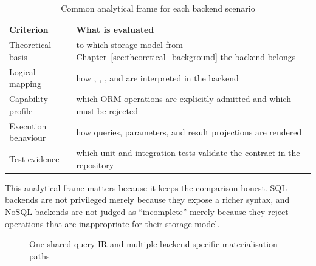 \begin{table}[H]
\centering
\small
\caption{Common analytical frame for each backend scenario}
\label{tab:backend_analysis_frame}
\begin{tabularx}{\textwidth}{L{3.3cm}Y}
\toprule
\textbf{Criterion} & \textbf{What is evaluated} \\
\midrule
Theoretical basis & to which storage model from Chapter~\ref{sec:theoretical_background} the backend belongs \\
Logical mapping & how , , , and  are interpreted in the backend \\
Capability profile & which ORM operations are explicitly admitted and which must be rejected \\
Execution behaviour & how queries, parameters, and result projections are rendered \\
Test evidence & which unit and integration tests validate the contract in the repository \\
\bottomrule
\end{tabularx}
\end{table}

This analytical frame matters because it keeps the comparison honest. SQL backends are not privileged merely because they expose a richer syntax, and NoSQL backends are not judged as ``incomplete'' merely because they reject operations that are inappropriate for their storage model.

\begin{figure}[H]
\centering
{}
\caption{One shared query IR and multiple backend-specific materialisation paths}
\label{fig:backend_materialisation_paths}
\end{figure}

